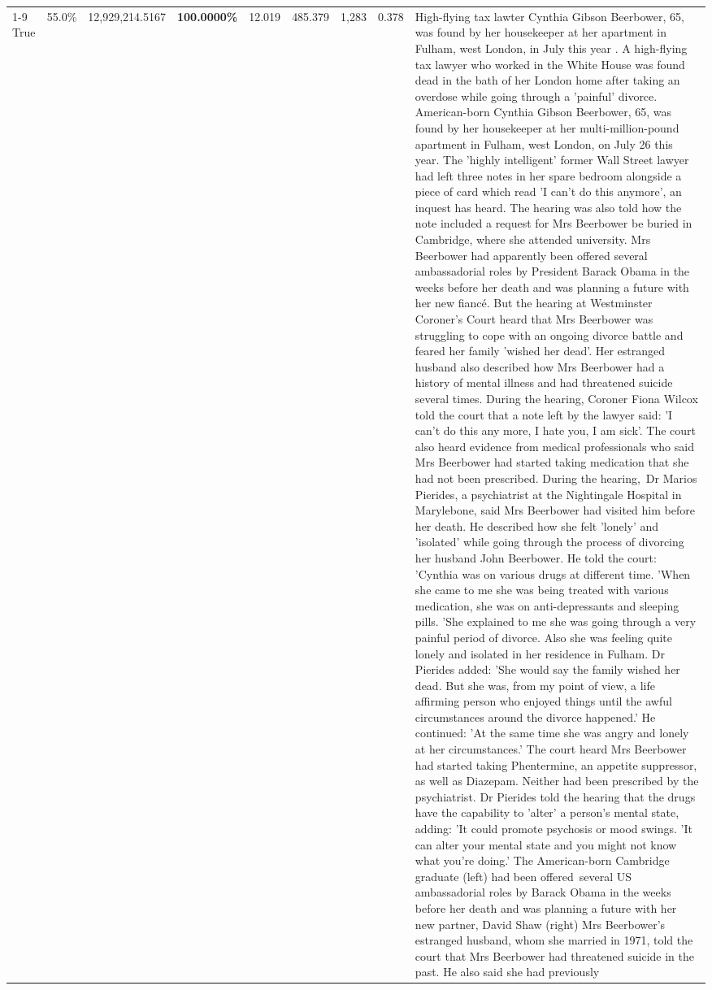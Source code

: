 \begin{table}[H]
\begin{tabular}{lllrlllll}
\cline{1-9}
True & 55.0\% & 12,929,214.5167 & \bfseries \color{red} 100.0000\% & 12.019 & 485.379 & 1,283 & 0.378 & High-flying tax lawter Cynthia Gibson Beerbower, 65, was found by her housekeeper at her apartment in Fulham, west London, in July this year . A high-flying tax lawyer who worked in the White House was found dead in the bath of her London home after taking an overdose while going through a 'painful' divorce. American-born Cynthia Gibson Beerbower, 65, was found by her housekeeper at her multi-million-pound apartment in Fulham, west London, on July 26 this year. The 'highly intelligent' former Wall Street lawyer had left three notes in her spare bedroom alongside a piece of card which read 'I can't do this anymore', an inquest has heard. The hearing was also told how the note included a request for Mrs Beerbower be buried in Cambridge, where she attended university. Mrs Beerbower had apparently been offered several ambassadorial roles by President Barack Obama in the weeks before her death and was planning a future with her new fiancé. But the hearing at Westminster Coroner's Court heard that Mrs Beerbower was struggling to cope with an ongoing divorce battle and feared her family 'wished her dead'. Her estranged husband also described how Mrs Beerbower had a history of mental illness and had threatened suicide several times. During the hearing, Coroner Fiona Wilcox told the court that a note left by the lawyer said: 'I can't do this any more, I hate you, I am sick'. The court also heard evidence from medical professionals who said Mrs Beerbower had started taking medication that she had not been prescribed. During the hearing, Dr Marios Pierides, a psychiatrist at the Nightingale Hospital in Marylebone, said Mrs Beerbower had visited him before her death. He described how she felt 'lonely' and 'isolated' while going through the process of divorcing her husband John Beerbower. He told the court: 'Cynthia was on various drugs at different time. 'When she came to me she was being treated with various medication, she was on anti-depressants and sleeping pills. 'She explained to me she was going through a very painful period of divorce. Also she was feeling quite lonely and isolated in her residence in Fulham. Dr Pierides added: 'She would say the family wished her dead. But she was, from my point of view, a life affirming person who enjoyed things until the awful circumstances around the divorce happened.' He continued: 'At the same time she was angry and lonely at her circumstances.' The court heard Mrs Beerbower had started taking Phentermine, an appetite suppressor, as well as Diazepam. Neither had been prescribed by the psychiatrist. Dr Pierides told the hearing that the drugs have the capability to 'alter' a person's mental state, adding: 'It could promote psychosis or mood swings. 'It can alter your mental state and you might not know what you're doing.' The American-born Cambridge graduate (left) had been offered several US ambassadorial roles by Barack Obama in the weeks before her death and was planning a future with her new partner, David Shaw (right) Mrs Beerbower's estranged husband, whom she married in 1971, told the court that Mrs Beerbower had threatened suicide in the past. He also said she had previously 
\end{tabular}
\end{table}
